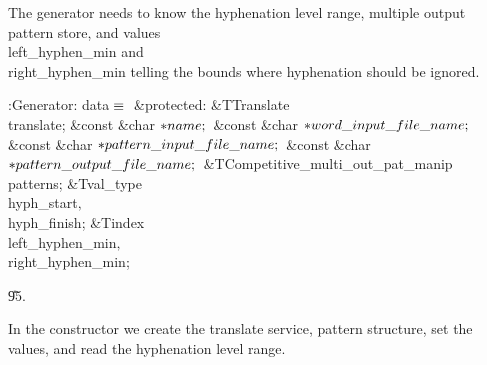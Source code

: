 The generator needs to know the hyphenation level range, multiple output
pattern store, and values \\{left\_hyphen\_min} and \\{right\_hyphen\_min}
telling the bounds where hyphenation should be ignored.

\Y\B\4:Generator: data\X${}\equiv{}$\6
\4\&{protected}:\6
\&{TTranslate} \\{translate};\6
\&{const} \&{char} ${}{*}\\{name};{}$\6
\&{const} \&{char} ${}{*}\\{word\_input\_file\_name};{}$\6
\&{const} \&{char} ${}{*}\\{pattern\_input\_file\_name};{}$\6
\&{const} \&{char} ${}{*}\\{pattern\_output\_file\_name};{}$\6
\&{TCompetitive\_multi\_out\_pat\_manip} \\{patterns};\6
\&{Tval\_type} \\{hyph\_start}${},{}$ \\{hyph\_finish};\6
\&{Tindex} \\{left\_hyphen\_min}${},{}$ \\{right\_hyphen\_min};\par
\U95.\fi

In the constructor we create the translate service, pattern structure,
set the values, and read the hyphenation level range.

